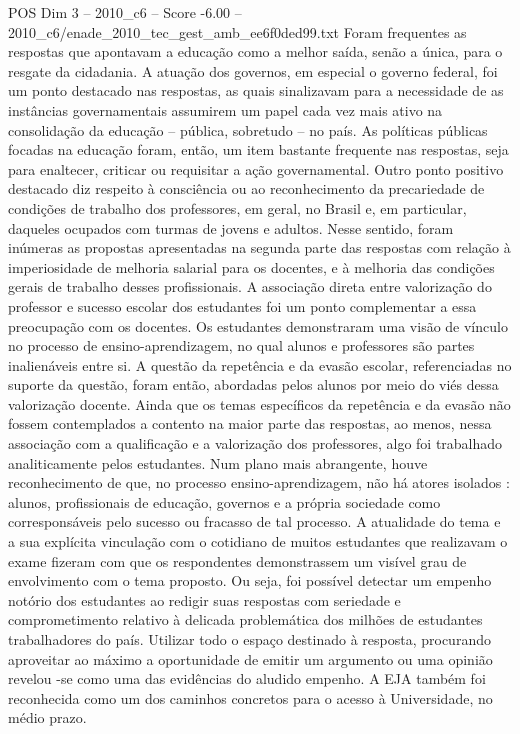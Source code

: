 \begin{textsample}{POS Dim 3 – 2010\_c6 – Score -6.00 – 2010\_c6/enade\_2010\_tec\_gest\_amb\_ee6f0ded99.txt}
Foram frequentes as respostas que apontavam a educação como a melhor saída, senão a única, para o resgate da cidadania.
A atuação dos governos, em especial o governo federal, foi um ponto destacado nas respostas, as quais sinalizavam para a necessidade de as instâncias governamentais assumirem um papel cada vez mais ativo na consolidação da educação – pública, sobretudo – no país.
As políticas públicas focadas na educação foram, então, um item bastante frequente nas respostas, seja para enaltecer, criticar ou requisitar a ação governamental.
Outro ponto positivo destacado diz respeito à consciência ou ao reconhecimento da precariedade de condições de trabalho dos professores, em geral, no Brasil e, em particular, daqueles ocupados com turmas de jovens e adultos.
Nesse sentido, foram inúmeras as propostas apresentadas na segunda parte das respostas com relação à imperiosidade de melhoria salarial para os docentes, e à melhoria das condições gerais de trabalho desses profissionais.
A associação direta entre valorização do professor e sucesso escolar dos estudantes foi um ponto complementar a essa preocupação com os docentes.
Os estudantes demonstraram uma visão de vínculo no processo de ensino-aprendizagem, no qual alunos e professores são partes inalienáveis entre si.
A questão da repetência e da evasão escolar, referenciadas no suporte da questão, foram então, abordadas pelos alunos por meio do viés dessa valorização docente.
Ainda que os temas específicos da repetência e da evasão não fossem contemplados a contento na maior parte das respostas, ao menos, nessa associação com a qualificação e a valorização dos professores, algo foi trabalhado analiticamente pelos estudantes.
Num plano mais abrangente, houve reconhecimento de que, no processo ensino-aprendizagem, não há atores isolados : alunos, profissionais de educação, governos e a própria sociedade como corresponsáveis pelo sucesso ou fracasso de tal processo.
A atualidade do tema e a sua explícita vinculação com o cotidiano de muitos estudantes que realizavam o exame fizeram com que os respondentes demonstrassem um visível grau de envolvimento com o tema proposto.
Ou seja, foi possível detectar um empenho notório dos estudantes ao redigir suas respostas com seriedade e comprometimento relativo à delicada problemática dos milhões de estudantes trabalhadores do país.
Utilizar todo o espaço destinado à resposta, procurando aproveitar ao máximo a oportunidade de emitir um argumento ou uma opinião revelou -se como uma das evidências do aludido empenho.
A EJA também foi reconhecida como um dos caminhos concretos para o acesso à Universidade, no médio prazo.

\end{textsample}
